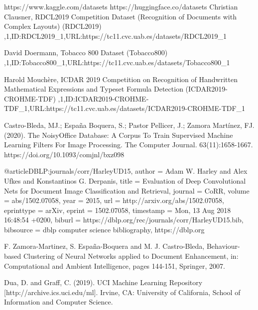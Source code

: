 \documentclass[runningheads]{llncs}
\begin{document}
%
%
%
% 
% 
%
\begin{thebibliography}{8}
  https://www.kaggle.com/datasets
  {https://huggingface.co/datasets}
{Christian Clausner, RDCL2019 Competition Dataset (Recognition of Documents with Complex Layouts) (RDCL2019) ,1,ID:RDCL2019\_1,URL:https://tc11.cvc.uab.es/datasets/RDCL2019_1}

{David Doermann, Tobacco 800 Dataset (Tobacco800) ,1,ID:Tobacco800_1,URL:https://tc11.cvc.uab.es/datasets/Tobacco800_1}

{Harold Mouchère, ICDAR 2019 Competition on Recognition of Handwritten Mathematical Expressions and Typeset Formula Detection (ICDAR2019-CROHME-TDF) ,1,ID:ICDAR2019-CROHME-TDF\_1,URL:https://tc11.cvc.uab.es/datasets/ICDAR2019-CROHME-TDF_1}

{Castro-Bleda, MJ.; España Boquera, S.; Pastor Pellicer, J.; Zamora Martínez, FJ. (2020). The NoisyOffice Database: A Corpus To Train Supervised Machine Learning Filters For Image Processing. The Computer Journal. 63(11):1658-1667. https://doi.org/10.1093/comjnl/bxz098}

  @article{DBLP:journals/corr/HarleyUD15,
  author    = {Adam W. Harley and
               Alex Ufkes and
               Konstantinos G. Derpanis},
  title     = {Evaluation of Deep Convolutional Nets for Document Image Classification
               and Retrieval},
  journal   = {CoRR},
  volume    = {abs/1502.07058},
  year      = {2015},
  url       = {http://arxiv.org/abs/1502.07058},
  eprinttype = {arXiv},
  eprint    = {1502.07058},
  timestamp = {Mon, 13 Aug 2018 16:48:54 +0200},
  biburl    = {https://dblp.org/rec/journals/corr/HarleyUD15.bib},
  bibsource = {dblp computer science bibliography, https://dblp.org}
}

{F. Zamora-Martinez, S. España-Boquera and M. J. Castro-Bleda, Behaviour-based Clustering of Neural Networks applied to Document Enhancement, in: Computational and Ambient Intelligence, pages 144-151, Springer, 2007.}

{Dua, D. and Graff, C. (2019). UCI Machine Learning Repository [http://archive.ics.uci.edu/ml]. Irvine, CA: University of California, School of Information and Computer Science.}


\end{thebibliography}
\end{document}
